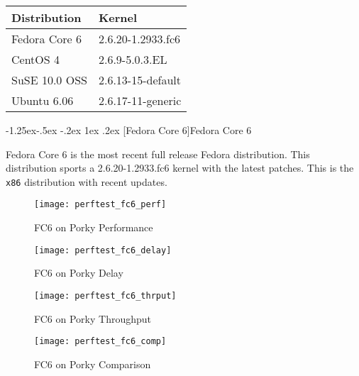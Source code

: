 \documentclass[letterpaper,final,notitlepage,twocolumn,10pt,twoside]{article}
\makeatletter
\renewcommand\subsubsection{\@startsection{subsubsection}{3}{\z@}%
                                     {-1.25ex\@plus -.5ex \@minus -.2ex}%
                                     {1ex \@plus .2ex}%
                                     {\normalfont\normalsize\bfseries}}
\makeatother
\begin{document}
\begin{tabular}{ll}\\
Distribution & Kernel\\
\hline
Fedora Core 6 & 2.6.20-1.2933.fc6\\
CentOS 4 & 2.6.9-5.0.3.EL\\
SuSE 10.0 OSS & 2.6.13-15-default\\
Ubuntu 6.06 & 2.6.17-11-generic\\
\end{tabular}

\subsubsection[Fedora Core 6]{Fedora Core 6}

Fedora Core 6 is the most recent full release Fedora distribution.  This
distribution sports a 2.6.20-1.2933.fc6 kernel with the latest patches.  This
is the \texttt{x86} distribution with recent updates.

\begin{figure}[p]
\texttt{[image: perftest\_fc6\_perf]}
\caption[FC6 on Porky Performance]{FC6 on Porky Performance}
\label{figure:fc6perf}
\end{figure}

\begin{figure}[p]
\texttt{[image: perftest\_fc6\_delay]}
\caption[FC6 on Porky Delay]{FC6 on Porky Delay}
\label{figure:fc6delay}
\end{figure}

\begin{figure}[p]
\texttt{[image: perftest\_fc6\_thrput]}
\caption[FC6 on Porky Throughput]{FC6 on Porky Throughput}
\label{figure:fc6thrput}
\end{figure}

\begin{figure}[p]
\texttt{[image: perftest\_fc6\_comp]}
\caption[FC6 on Porky Comparison]{FC6 on Porky Comparison}
\label{figure:fc6comp}
\end{figure}
\end{document}
